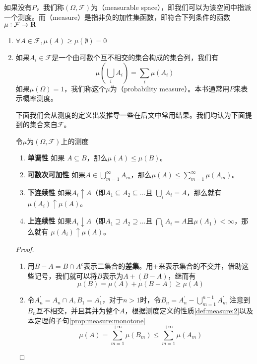 \documentclass[main.tex]{subfiles}
\begin{document}
如果没有\(P\)，我们称\((\Omega, \mathcal{F})\)为（measurable space），即我们可以为该空间中指派一个测度。而（measure）是指非负的加性集函数，即符合下列条件的函数\(\mu: \mathcal{F} \rightarrow \mathbf{R}\)
\begin{enumerate}
	\item \(\forall A \in \mathcal{F}, \mu(A) \geq \mu(\emptyset) = 0\)
	\item 如果\(A_i \in \mathcal{F}\)是一个由可数个互不相交的集合构成的集合列，我们有
	\[\mu\left(\bigcup_i A_i\right) = \sum_{i}\mu(A_i)\]
	如果\(\mu(\Omega) = 1\)，我们称这个\(\mu\)为（probability measure）。本书通常用\(P\)来表示概率测度。

	下面我们会从测度的定义出发推导一些在后文中常用结果。我们均认为下面提到的集合来自\(\mathcal{F}\)。
	\begin{theorem} \label{thm:1.1.1}
		令\(\mu\)为\((\Omega, \mathcal{F})\)上的测度
		\begin{enumerate}
			\item \label{prop:measure:monotone} \textbf{单调性} 如果 \(A \subseteq B\)，那么\(\mu(A) \leq \mu(B)\)。
			\item \textbf{可数次可加性}\label{thm:1.1.1.2} 如果\(A \in \bigcup_{m=1}^\infty A_m\)，那么\(\mu(A) \leq \sum_{m=1}^\infty\mu(A_m)\)。
			\item \label{prop:measure:below_continuity} \textbf{下连续性} %
			 如果\(A_i \uparrow A\)（即\(A_1 \subseteq A_2 \subseteq \dots\)且 \(\bigcup_i A_i = A\)，那么就有 \(\mu(A_i) \uparrow \mu(A)\)。
			\item \textbf{上连续性} 如果\(A_i \downarrow A\)（即\(A_1 \supseteq A_2 \supseteq \dots\)且 \(\bigcap_i A_i = A\)且\(\mu(A_1) < \infty\)，那么就有 \(\mu(A_i) \uparrow \mu(A)\)。
		\end{enumerate}
	\end{theorem}
	\begin{proof}
		\begin{enumerate}
			\item 用\(B-A = B\cap A^c\)表示二集合的\textbf{差集}。用\(+\)来表示集合的不交并，借助这些记号，我们就可以将\(B\)表示为\(A+(B-A)\)，继而有
			\[\mu(B) = \mu(A) + \mu(B-A) \geq \mu(A)\]
			\item 令\(A^\prime_n = A_n \cap A, B_1 = A^\prime_1\)，对于\(n > 1\)时，令\(B_n=A^\prime_n - \bigcup_{m=1}^{n-1}A^\prime_m\)
			注意到\(B_n\)互不相交，并且其并为整个\(A\)，根据测度定义的性质\ref{def:measure:2}以及本定理的子句\ref{prop:measure:monotone}
			\[\mu(A) = \sum_{m=1}^{+\infty}\mu(B_m) \leq \sum_{m=1}^{+\infty}\mu(A_m)\]

\end{enumerate}
\end{proof}
\end{enumerate}
\end{document}
